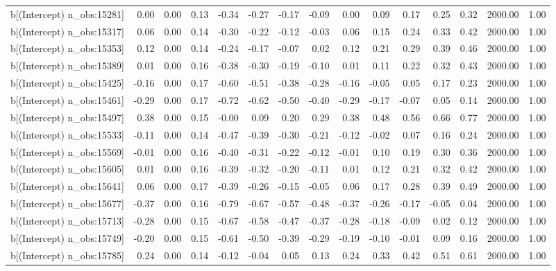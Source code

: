 \begin{table}[ht]
\begin{tabular}{rrrrrrrrrrrrrrr}
  b[(Intercept) n\_obs:15281] & 0.00 & 0.00 & 0.13 & -0.34 & -0.27 & -0.17 & -0.09 & 0.00 & 0.09 & 0.17 & 0.25 & 0.32 & 2000.00 & 1.00 \\ 
  b[(Intercept) n\_obs:15317] & 0.06 & 0.00 & 0.14 & -0.30 & -0.22 & -0.12 & -0.03 & 0.06 & 0.15 & 0.24 & 0.33 & 0.42 & 2000.00 & 1.00 \\ 
  b[(Intercept) n\_obs:15353] & 0.12 & 0.00 & 0.14 & -0.24 & -0.17 & -0.07 & 0.02 & 0.12 & 0.21 & 0.29 & 0.39 & 0.46 & 2000.00 & 1.00 \\ 
  b[(Intercept) n\_obs:15389] & 0.01 & 0.00 & 0.16 & -0.38 & -0.30 & -0.19 & -0.10 & 0.01 & 0.11 & 0.22 & 0.32 & 0.43 & 2000.00 & 1.00 \\ 
  b[(Intercept) n\_obs:15425] & -0.16 & 0.00 & 0.17 & -0.60 & -0.51 & -0.38 & -0.28 & -0.16 & -0.05 & 0.05 & 0.17 & 0.23 & 2000.00 & 1.00 \\ 
  b[(Intercept) n\_obs:15461] & -0.29 & 0.00 & 0.17 & -0.72 & -0.62 & -0.50 & -0.40 & -0.29 & -0.17 & -0.07 & 0.05 & 0.14 & 2000.00 & 1.00 \\ 
  b[(Intercept) n\_obs:15497] & 0.38 & 0.00 & 0.15 & -0.00 & 0.09 & 0.20 & 0.29 & 0.38 & 0.48 & 0.56 & 0.66 & 0.77 & 2000.00 & 1.00 \\ 
  b[(Intercept) n\_obs:15533] & -0.11 & 0.00 & 0.14 & -0.47 & -0.39 & -0.30 & -0.21 & -0.12 & -0.02 & 0.07 & 0.16 & 0.24 & 2000.00 & 1.00 \\ 
  b[(Intercept) n\_obs:15569] & -0.01 & 0.00 & 0.16 & -0.40 & -0.31 & -0.22 & -0.12 & -0.01 & 0.10 & 0.19 & 0.30 & 0.36 & 2000.00 & 1.00 \\ 
  b[(Intercept) n\_obs:15605] & 0.01 & 0.00 & 0.16 & -0.39 & -0.32 & -0.20 & -0.11 & 0.01 & 0.12 & 0.21 & 0.32 & 0.42 & 2000.00 & 1.00 \\ 
  b[(Intercept) n\_obs:15641] & 0.06 & 0.00 & 0.17 & -0.39 & -0.26 & -0.15 & -0.05 & 0.06 & 0.17 & 0.28 & 0.39 & 0.49 & 2000.00 & 1.00 \\ 
  b[(Intercept) n\_obs:15677] & -0.37 & 0.00 & 0.16 & -0.79 & -0.67 & -0.57 & -0.48 & -0.37 & -0.26 & -0.17 & -0.05 & 0.04 & 2000.00 & 1.00 \\ 
  b[(Intercept) n\_obs:15713] & -0.28 & 0.00 & 0.15 & -0.67 & -0.58 & -0.47 & -0.37 & -0.28 & -0.18 & -0.09 & 0.02 & 0.12 & 2000.00 & 1.00 \\ 
  b[(Intercept) n\_obs:15749] & -0.20 & 0.00 & 0.15 & -0.61 & -0.50 & -0.39 & -0.29 & -0.19 & -0.10 & -0.01 & 0.09 & 0.16 & 2000.00 & 1.00 \\ 
  b[(Intercept) n\_obs:15785] & 0.24 & 0.00 & 0.14 & -0.12 & -0.04 & 0.05 & 0.13 & 0.24 & 0.33 & 0.42 & 0.51 & 0.61 & 2000.00 & 1.00 \\ 

\end{tabular}
\end{table}
